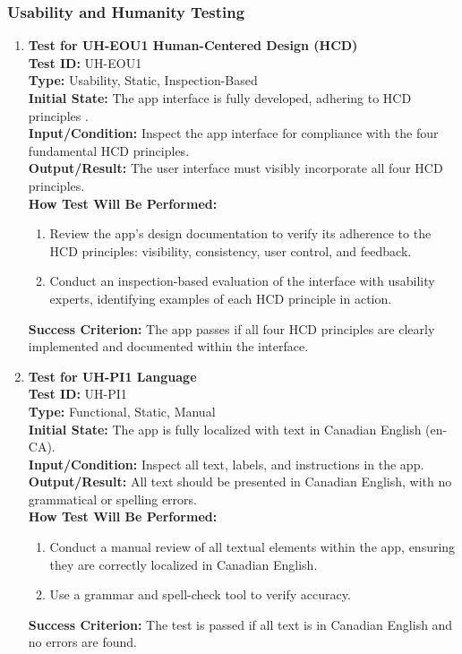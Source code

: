 \documentclass[12pt, titlepage]{article}
\begin{document}
\subsubsection{Usability and Humanity Testing}
\begin{enumerate}
    \item \textbf{Test for UH-EOU1 Human-Centered Design (HCD)} \\
      \newline
      \textbf{Test ID:} UH-EOU1 \\
      \textbf{Type:} Usability, Static, Inspection-Based \\
      \textbf{Initial State:} The app interface is fully developed, adhering to HCD principles \cite{HCD}. \\
      \textbf{Input/Condition:} Inspect the app interface for compliance with the four fundamental HCD principles. \\
      \textbf{Output/Result:} The user interface must visibly incorporate all four HCD principles. \\
      \textbf{How Test Will Be Performed:}
      \begin{enumerate}
          \item Review the app’s design documentation to verify its adherence to the HCD principles: visibility, consistency, user control, and feedback.
          \item Conduct an inspection-based evaluation of the interface with usability experts, identifying examples of each HCD principle in action.
      \end{enumerate}
      \textbf{Success Criterion:} The app passes if all four HCD principles are clearly implemented and documented within the interface.

    \item \textbf{Test for UH-PI1 Language} \\
      \newline
      \textbf{Test ID:} UH-PI1 \\
      \textbf{Type:} Functional, Static, Manual \\
      \textbf{Initial State:} The app is fully localized with text in Canadian English (en-CA). \\
      \textbf{Input/Condition:} Inspect all text, labels, and instructions in the app. \\
      \textbf{Output/Result:} All text should be presented in Canadian English, with no grammatical or spelling errors. \\
      \textbf{How Test Will Be Performed:}
      \begin{enumerate}
          \item Conduct a manual review of all textual elements within the app, ensuring they are correctly localized in Canadian English.
          \item Use a grammar and spell-check tool to verify accuracy.
      \end{enumerate}
      \textbf{Success Criterion:} The test is passed if all text is in Canadian English and no errors are found.


\end{enumerate}
\end{document}
